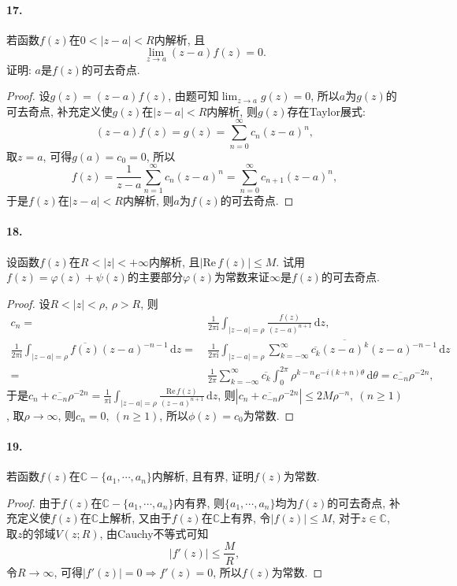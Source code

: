 \documentclass[12pt, a4paper, oneside]{ctexart}
\let\leq=\leqslant %
\let\geq=\geqslant %
\def\C{\mathbb{C}}      %
\def\d{\mathrm{d}}      %
\def\i{\mathrm{i}}      %
\def\re{\mathrm{Re}\,}    %
\def\ol{\overline}      %
\begin{document}
\paragraph{17.}若函数$f(z)$在$0 < |z-a| < R$内解析, 且
\begin{equation*}
    \lim_{z\to a}(z-a)f(z) = 0.
\end{equation*}
证明: $a$是$f(z)$的可去奇点.
\begin{proof}
    设$g(z) = (z-a)f(z)$, 由题可知$\lim_{z\to a}g(z) = 0$, 所以$a$为$g(z)$的可去奇点, 补充定义使$g(z)$在$|z-a| < R$内解析, 则$g(z)$存在Taylor展式:
    \begin{equation*}
        (z-a)f(z) = g(z) = \sum_{n=0}^\infty c_n(z-a)^n,
    \end{equation*}
    取$z=a$, 可得$g(a) = c_0 = 0$, 所以
    \begin{equation*}
        f(z) = \frac{1}{z-a}\sum_{n=1}^\infty c_n(z-a)^n = \sum_{n=0}^\infty c_{n+1}(z-a)^n,
    \end{equation*}
    于是$f(z)$在$|z-a| < R$内解析, 则$a$为$f(z)$的可去奇点.
\end{proof}
\paragraph{18.}设函数$f(z)$在$R < |z| < +\infty$内解析, 且$|\re f(z)|\leq M$. 试用$f(z) = \varphi(z) + \psi(z)$的主要部分$\varphi(z)$为常数来证$\infty$是$f(z)$的可去奇点.
\begin{proof}
    设$R < |z| < \rho$, $\rho > R$, 则
    \begin{align*}
        c_n =&\ \frac{1}{2\pi \i}\int_{|z-a| = \rho}\frac{f(z)}{(z-a)^{n+1}}\,\d z,\\
        \frac{1}{2\pi\i}\int_{|z-a|=\rho}\ol{f(z)}(z-a)^{-n-1}\,\d z =&\ \frac{1}{2\pi\i}\int_{|z-a| = \rho}\sum_{k=-\infty}^\infty \ol{c_k}\ol{(z-a)^k}(z-a)^{-n-1}\,\d z\\
        =&\ \frac{1}{2\pi}\sum_{k=-\infty}^\infty \ol{c_k}\int_0^{2\pi}\rho^{k-n}e^{-i(k+n)\theta}\,\d\theta = \ol{c_{-n}}\rho^{-2n},
    \end{align*}
    于是$c_n+\ol{c_{-n}}\rho^{-2n} = \frac{1}{\pi\i}\int_{|z-a|=\rho}\frac{\re f(z)}{(z-a)^{n+1}}\,\d z$, 则$|c_n+\ol{c_{-n}}\rho^{-2n}|\leq 2M\rho^{-n},\ (n\geq 1)$, 取$\rho\to \infty$, 则$c_n = 0,\ (n\geq 1)$, 所以$\phi(z) = c_0$为常数.
\end{proof}
\paragraph{19.}若函数$f(z)$在$\C-\{a_1,\cdots, a_n\}$内解析, 且有界, 证明$f(z)$为常数.
\begin{proof}
    由于$f(z)$在$\C-\{a_1,\cdots, a_n\}$内有界, 则$\{a_1,\cdots, a_n\}$均为$f(z)$的可去奇点, 补充定义使$f(z)$在$\C$上解析, 又由于$f(z)$在$\C$上有界, 令$|f(z)|\leq M$, 对于$z\in \C$, 取$z$的邻域$V(z;R)$, 由Cauchy不等式可知
    \begin{equation*}
        |f'(z)|\leq \frac{M}{R},
    \end{equation*}
    令$R\to \infty$, 可得$|f'(z)| = 0\Rightarrow f'(z) = 0$, 所以$f(z)$为常数.
\end{proof}
\end{document}
